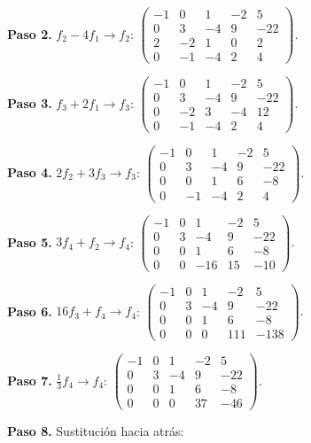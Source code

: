 \begin{prob}
\begin{myproof}
\textbf{Paso 2.} $f_2 - 4f_1 \to f_2$: $\left(\begin{array}{cccc|c}
-1 & 0 & 1 & -2 & 5 \\
0 & 3 & -4 & 9 & -22 \\
2 & -2 & 1 & 0 & 2 \\
0 & -1 & -4 & 2 & 4
\end{array}\right).$

\textbf{Paso 3.} $f_3 + 2f_1 \to f_3$: $\left(\begin{array}{cccc|c}
-1 & 0 & 1 & -2 & 5 \\
0 & 3 & -4 & 9 & -22 \\
0 & -2 & 3 & -4 & 12 \\
0 & -1 & -4 & 2 & 4
\end{array}\right).$

\textbf{Paso 4.} $2f_2 + 3f_3 \to f_3$: $\left(\begin{array}{cccc|c}
-1 & 0 & 1 & -2 & 5 \\
0 & 3 & -4 & 9 & -22 \\
0 & 0 & 1 & 6 & -8 \\
0 & -1 & -4 & 2 & 4
\end{array}\right).$

\textbf{Paso 5.} $3f_4 + f_2 \to f_4$: $\left(\begin{array}{cccc|c}
-1 & 0 & 1 & -2 & 5 \\
0 & 3 & -4 & 9 & -22 \\
0 & 0 & 1 & 6 & -8 \\
0 & 0 & -16 & 15 & -10
\end{array}\right).$

\textbf{Paso 6.} $16f_3 + f_4 \to f_4$: $\left(\begin{array}{cccc|c}
-1 & 0 & 1 & -2 & 5 \\
0 & 3 & -4 & 9 & -22 \\
0 & 0 & 1 & 6 & -8 \\
0 & 0 & 0 & 111 & -138
\end{array}\right).$

\textbf{Paso 7.} $\frac{1}{3}f_4 \to f_4$: $\left(\begin{array}{cccc|c}
-1 & 0 & 1 & -2 & 5 \\
0 & 3 & -4 & 9 & -22 \\
0 & 0 & 1 & 6 & -8 \\
0 & 0 & 0 & 37 & -46
\end{array}\right).$

\textbf{Paso 8.} Sustitución hacia atrás:


\end{myproof}
\end{prob}
